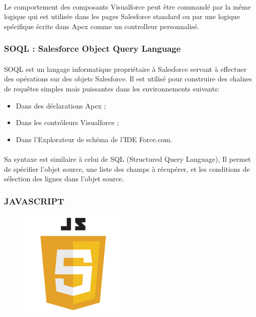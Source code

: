\documentclass[a4paper, 12pt]{report}
\begin{document}
\begin{itemize}
\paragraph{}
Le comportement des composants Visualforce peut être commandé par la même logique qui est utilisée dans les pages Salesforce standard ou par une logique spécifique écrite dans Apex comme un controlleur personnalisé.

\subsubsection{SOQL : Salesforce Object Query Language}

\paragraph{}
SOQL est un langage informatique propriétaire à Salesforce servant à effectuer des opérations sur des objets Salesforce. Il est utilisé pour construire des chaînes de requêtes simples mais puissantes dans les environnements suivants:
\begin{itemize}
\item	Dans des déclarations Apex ;
\item	Dans les contrôleurs Visualforce ;
\item	Dans l'Explorateur de schéma de l'IDE Force.com.
\end{itemize}
\paragraph{}
Sa syntaxe est similaire à celui de SQL (Structured Query Language), Il permet de spécifier l'objet source, une liste des champs à récupérer, et les conditions de sélection des lignes dans l'objet source.

\subsubsection{JAVASCRIPT}
\begin{figure}[H]
	\centering
		\includegraphics{js.png}
	\label{fig:js}
\end{figure}


\end{itemize}
\end{document}
